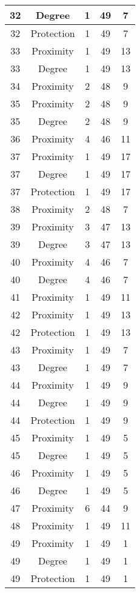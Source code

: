 \documentclass[results.tex]{subfiles}
\begin{document}
\begin{center}
\begin{tabular}{| c || c | c | c | c |}
    32 & Degree & 1 & 49 & 7 \\ 
    \hline
    32 & Protection & 1 & 49 & 7 \\ 
    \hline
    33 & Proximity & 1 & 49 & 13 \\ 
    \hline
    33 & Degree & 1 & 49 & 13 \\ 
    \hline
    34 & Proximity & 2 & 48 & 9 \\ 
    \hline
    35 & Proximity & 2 & 48 & 9 \\ 
    \hline
    35 & Degree & 2 & 48 & 9 \\ 
    \hline
    36 & Proximity & 4 & 46 & 11 \\ 
    \hline
    37 & Proximity & 1 & 49 & 17 \\ 
    \hline
    37 & Degree & 1 & 49 & 17 \\ 
    \hline
    37 & Protection & 1 & 49 & 17 \\ 
    \hline
    38 & Proximity & 2 & 48 & 7 \\ 
    \hline
    39 & Proximity & 3 & 47 & 13 \\ 
    \hline
    39 & Degree & 3 & 47 & 13 \\ 
    \hline
    40 & Proximity & 4 & 46 & 7 \\ 
    \hline
    40 & Degree & 4 & 46 & 7 \\ 
    \hline
    41 & Proximity & 1 & 49 & 11 \\ 
    \hline
    42 & Proximity & 1 & 49 & 13 \\ 
    \hline
    42 & Protection & 1 & 49 & 13 \\ 
    \hline
    43 & Proximity & 1 & 49 & 7 \\ 
    \hline
    43 & Degree & 1 & 49 & 7 \\ 
    \hline
    44 & Proximity & 1 & 49 & 9 \\ 
    \hline
    44 & Degree & 1 & 49 & 9 \\ 
    \hline
    44 & Protection & 1 & 49 & 9 \\ 
    \hline
    45 & Proximity & 1 & 49 & 5 \\ 
    \hline
    45 & Degree & 1 & 49 & 5 \\ 
    \hline
    46 & Proximity & 1 & 49 & 5 \\ 
    \hline
    46 & Degree & 1 & 49 & 5 \\ 
    \hline
    47 & Proximity & 6 & 44 & 9 \\ 
    \hline
    48 & Proximity & 1 & 49 & 11 \\ 
    \hline
    49 & Proximity & 1 & 49 & 1 \\ 
    \hline
    49 & Degree & 1 & 49 & 1 \\ 
    \hline
    49 & Protection & 1 & 49 & 1 \\ 
    \hline   \end{tabular}
\end{center}
\end{document}
